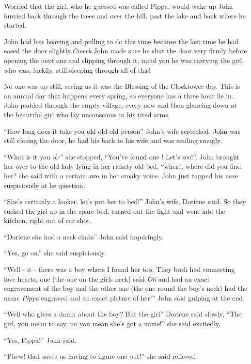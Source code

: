 Worried that the girl, who he guessed was called Pippa, would wake up
John hurried back through the trees and over the hill, past the lake and
back where he started.

John had less heaving and pulling to do this time because the last time
he had eased the door slightly.\emph{Creeek} John made sure he shut the
door very firmly before opening the next one and slipping through it,
mind you he was carrying the girl, who was, luckily, still sleeping
through all of this!

No one was up still, seeing as it was the Blessing of the Clocktower
day. This is an annual day that happens every spring, so everyone has a
three hour lie in. John padded through the empty village, every now and
then glancing down at the beautiful girl who lay unconscious in his
tired arms.

``How long does it take you old-old-old person'' John's wife screeched.
John was still closing the door, he had his back to his wife and was
smiling smugly.

``What is it you ol-'' she stopped, ``You've found one ! Let's see!''.
John brought her over to the old lady lying in her rickety old bed.
``where, where did you find her? she said with a certain awe in her
croaky voice. John just tapped his nose suspiciously at he question.

``She's certainly a looker, let's put her to bed!'' John's wife, Doriene
said. So they tucked the girl up in the spare bed, turned out the light
and went into the kitchen, right out of ear shot.

``Doriene she had a neck chain'' John said inquiringly.

``Yes, go on.'' she said suspiciously.

``Well - it - there was a boy where I found her too. They both had
connecting love hearts, one (the one on the girls neck) said \emph{Oli}
and had an exact engravement of the boy and the other one (the one round
the boy's neck) had the name \emph{Pippa} engraved and an exact picture
of her!'' John said gulping at the end.

``Well who gives a damn about the boy? But the girl'' Doriene said
slowly, ``The girl, you mean to say, no you mean she's got a name!'' she
said excitedly.

``Yes, Pippa!'' John said.

``Phew! that saves us having to figure one out!'' she said relieved.

